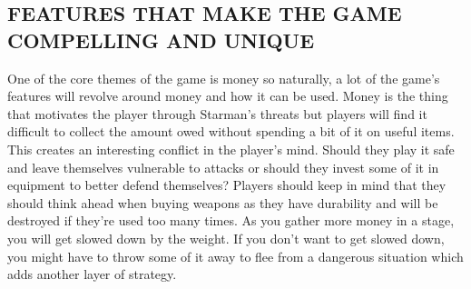 \documentclass{article}
\begin{document}
\subsection{FEATURES THAT MAKE THE GAME COMPELLING AND UNIQUE \label{features}}
One of the core themes of the game is money so naturally, a lot of the game's features will revolve around money and how it can be used. Money is the thing that motivates the player through Starman's threats but players will find it difficult to collect the amount owed without spending a bit of it on useful items. This creates an interesting conflict in the player's mind. Should they play it safe and leave themselves vulnerable to attacks or should they invest some of it in equipment to better defend themselves? Players should keep in mind that they should think ahead when buying weapons as they have durability and will be destroyed if they're used too many times. As you gather more money in a stage, you will get slowed down by the weight. If you don't want to get slowed down, you might have to throw some of it away to flee from a dangerous situation which adds another layer of strategy. 
\end{document}
